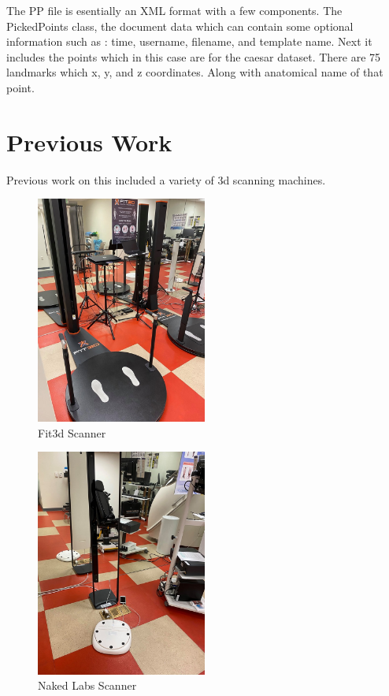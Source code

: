 The PP file is esentially an XML format with a few components. The PickedPoints class, the document data which can contain some optional information such as : time, username, filename, and template name. Next it includes the points which in this case are for the caesar dataset. There are 75 landmarks which x, y, and z coordinates. Along with anatomical name of that point.

\chapter{Previous Work}

Previous work on this included a variety of 3d scanning machines. 
\begin{figure}[h]
	\caption{Fit3d Scanner}
	\centering
	\includegraphics[width=0.5\textwidth]{images/fit3d.jpg}
\end{figure}
\begin{figure}[h]
	\caption{Naked Labs Scanner}
	\centering
	\includegraphics[width=0.5\textwidth]{images/naked_labs.jpg}
\end{figure}
